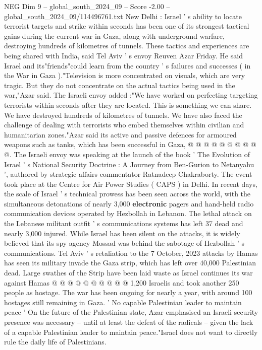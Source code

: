 \begin{textsample}{NEG Dim 9 – global\_south\_2024\_09 – Score -2.00 – global\_south\_2024\_09/114496761.txt}  \label{ex:f9_neg_202}
New Delhi : Israel ' s ability to locate terrorist targets and strike within seconds has been one of its strongest tactical gains during the current war in Gaza, along with underground warfare, destroying hundreds of kilometres of tunnels.
These tactics and experiences are being shared with India, said Tel Aviv ' s envoy Reuven Azar Friday.
He said Israel and its"friends"could learn from the country ' s failures and successes ( in the War in Gaza )."Television is more concentrated on visuals, which are very tragic.
But they do not concentrate on the actual tactics being used in the war,"Azar said.
The Israeli envoy added :"We have worked on perfecting targeting terrorists within seconds after they are located.
This is something we can share.
We have destroyed hundreds of kilometres of tunnels.
We have also faced the challenge of dealing with terrorists who embed themselves within civilian and humanitarian zones."Azar said its active and passive defences for armoured weapons such as tanks, which has been successful in Gaza, @ @ @ @ @ @ @ @ @ @.
The Israeli envoy was speaking at the launch of the book ' The Evolution of Israel ' s National Security Doctrine : A Journey from Ben-Gurion to Netanyahu ', authored by strategic affairs commentator Ratnadeep Chakraborty.
The event took place at the Centre for Air Power Studies ( CAPS ) in Delhi.
In recent days, the scale of Israel ' s technical prowess has been seen across the world, with the simultaneous detonations of nearly 3,000 \textbf{electronic} pagers and hand-held radio communication devices operated by Hezbollah in Lebanon.
The lethal attack on the Lebanese militant outfit ' s communications systems has left 37 dead and nearly 3,000 injured.
While Israel has been silent on the attacks, it is widely believed that its spy agency Mossad was behind the sabotage of Hezbollah ' s communications.
Tel Aviv ' s retaliation to the 7 October, 2023 attacks by Hamas has seen its military invade the Gaza strip, which has left over 40,000 Palestinian dead.
Large swathes of the Strip have been laid waste as Israel continues its war against Hamas @ @ @ @ @ @ @ @ @ @ 1,200 Israelis and took another 250 people as hostage.
The war has been ongoing for nearly a year, with around 100 hostages still remaining in Gaza. ' No capable Palestinian leader to maintain peace ' On the future of the Palestinian state, Azar emphasised an Israeli security presence was necessary -- until at least the defeat of the radicals -- given the lack of a capable Palestinian leader to maintain peace."Israel does not want to directly rule the daily life of Palestinians.

\end{textsample}
